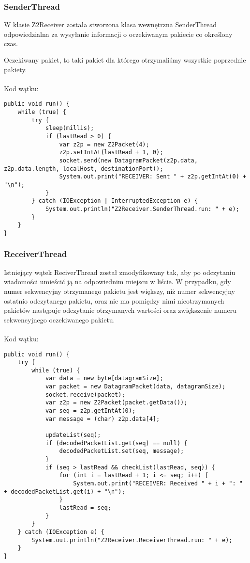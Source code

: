 \documentclass[12pt]{article}
\begin{document}
\subsubsection{SenderThread}
W klasie Z2Receiver została stworzona klasa wewnętrzna SenderThread odpowiedzialna za wysyłanie informacji o oczekiwanym pakiecie co określony czas.

Oczekiwany pakiet, to taki pakiet dla którego otrzymaliśmy wszystkie poprzednie pakiety.
\\
\\
Kod wątku:
\begin{verbatim}
public void run() {
    while (true) {
        try {
            sleep(millis);
            if (lastRead > 0) {
                var z2p = new Z2Packet(4);
                z2p.setIntAt(lastRead + 1, 0);
                socket.send(new DatagramPacket(z2p.data, z2p.data.length, localHost, destinationPort));
                System.out.print("RECEIVER: Sent " + z2p.getIntAt(0) + "\n");
            }
        } catch (IOException | InterruptedException e) {
            System.out.println("Z2Receiver.SenderThread.run: " + e);
        }
    }
}
\end{verbatim}

\subsubsection{ReceiverThread}
Istniejący wątek ReciverThread został zmodyfikowany tak, aby po odczytaniu wiadomości umieścić ją na odpowiednim miejscu w liście. W przypadku, gdy numer sekwencyjny otrzymanego pakietu jest większy, niż numer sekwencyjny ostatnio odczytanego pakietu, oraz nie ma pomiędzy nimi nieotrzymanych pakietów następuje odczytanie otrzymanych wartości oraz zwiększenie numeru sekwencyjnego oczekiwanego pakietu. 
\\
\\
Kod wątku:
\begin{verbatim}
public void run() {
    try {
        while (true) {
            var data = new byte[datagramSize];
            var packet = new DatagramPacket(data, datagramSize);
            socket.receive(packet);
            var z2p = new Z2Packet(packet.getData());
            var seq = z2p.getIntAt(0);
            var message = (char) z2p.data[4];

            updateList(seq);
            if (decodedPacketList.get(seq) == null) {
                decodedPacketList.set(seq, message);
            }
            if (seq > lastRead && checkList(lastRead, seq)) {
                for (int i = lastRead + 1; i <= seq; i++) {
                    System.out.print("RECEIVER: Received " + i + ": " + decodedPacketList.get(i) + "\n");
                }
                lastRead = seq;
            }
        }
    } catch (IOException e) {
        System.out.println("Z2Receiver.ReceiverThread.run: " + e);
    }
}
\end{verbatim}
\end{document}
